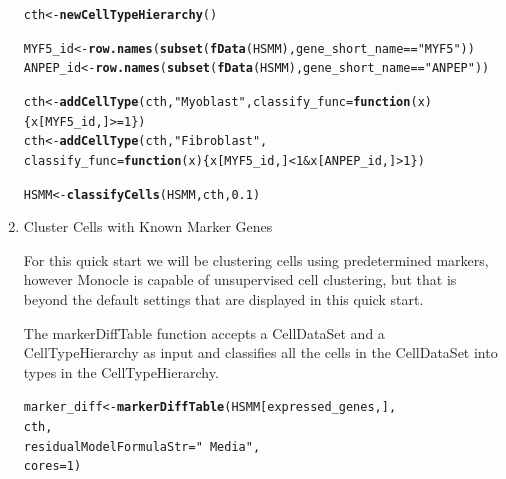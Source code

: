 \documentclass[10pt,oneside]{article}\usepackage[]{graphicx}\usepackage[]{color}
\makeatletter
\newcommand{\hlnum}[1]{\textcolor[rgb]{0.686,0.059,0.569}{#1}}%
\newcommand{\hlstr}[1]{\textcolor[rgb]{0.192,0.494,0.8}{#1}}%
\newcommand{\hlopt}[1]{\textcolor[rgb]{0,0,0}{#1}}%
\newcommand{\hlstd}[1]{\textcolor[rgb]{0.345,0.345,0.345}{#1}}%
\newcommand{\hlkwa}[1]{\textcolor[rgb]{0.161,0.373,0.58}{\textbf{#1}}}%
\newcommand{\hlkwb}[1]{\textcolor[rgb]{0.69,0.353,0.396}{#1}}%
\newcommand{\hlkwc}[1]{\textcolor[rgb]{0.333,0.667,0.333}{#1}}%
\newcommand{\hlkwd}[1]{\textcolor[rgb]{0.737,0.353,0.396}{\textbf{#1}}}%
\newenvironment{kframe}{%
 \def\at@end@of@kframe{}%
 \ifinner\ifhmode%
  \def\at@end@of@kframe{\end{minipage}}%
  \begin{minipage}{\columnwidth}%
 \fi\fi%
 \def\FrameCommand##1{\hskip\@totalleftmargin \hskip-\fboxsep
 \colorbox{shadecolor}{##1}\hskip-\fboxsep
     \hskip-\linewidth \hskip-\@totalleftmargin \hskip\columnwidth}%
 \MakeFramed {\advance\hsize-\width
   \@totalleftmargin\z@ \linewidth\hsize
   \@setminipage}}%
 {\par\unskip\endMakeFramed%
 \at@end@of@kframe}
\newenvironment{knitrout}{}{} %
\makeatother
\begin{document}
\begin{enumerate}
\begin{knitrout}
\color{fgcolor}\begin{kframe}
\begin{alltt}
\hlstd{cth} \hlkwb{<-} \hlkwd{newCellTypeHierarchy}\hlstd{()}

\hlstd{MYF5_id} \hlkwb{<-} \hlkwd{row.names}\hlstd{(}\hlkwd{subset}\hlstd{(}\hlkwd{fData}\hlstd{(HSMM), gene_short_name} \hlopt{==} \hlstr{"MYF5"}\hlstd{))}
\hlstd{ANPEP_id} \hlkwb{<-} \hlkwd{row.names}\hlstd{(}\hlkwd{subset}\hlstd{(}\hlkwd{fData}\hlstd{(HSMM), gene_short_name} \hlopt{==} \hlstr{"ANPEP"}\hlstd{))}

\hlstd{cth} \hlkwb{<-} \hlkwd{addCellType}\hlstd{(cth,} \hlstr{"Myoblast"}\hlstd{,} \hlkwc{classify_func} \hlstd{=} \hlkwa{function}\hlstd{(}\hlkwc{x}\hlstd{) \{x[MYF5_id,]} \hlopt{>=} \hlnum{1}\hlstd{\})}
\hlstd{cth} \hlkwb{<-} \hlkwd{addCellType}\hlstd{(cth,} \hlstr{"Fibroblast"}\hlstd{,}
                   \hlkwc{classify_func} \hlstd{=} \hlkwa{function}\hlstd{(}\hlkwc{x}\hlstd{) \{x[MYF5_id,]} \hlopt{<} \hlnum{1} \hlopt{&} \hlstd{x[ANPEP_id,]} \hlopt{>} \hlnum{1}\hlstd{\} )}

\hlstd{HSMM} \hlkwb{<-} \hlkwd{classifyCells}\hlstd{(HSMM, cth,} \hlnum{0.1}\hlstd{)}
\end{alltt}
\end{kframe}
\end{knitrout}
 
 \item Cluster Cells with Known Marker Genes
 
 For this quick start we will be clustering cells using predetermined markers, however Monocle is capable of unsupervised cell clustering, but that is beyond the default settings that are displayed in this quick start.
 
 The markerDiffTable function accepts a CellDataSet and a CellTypeHierarchy as input and classifies all the cells in the CellDataSet into types in the CellTypeHierarchy.
\begin{knitrout}
\color{fgcolor}\begin{kframe}
\begin{alltt}
\hlstd{marker_diff} \hlkwb{<-} \hlkwd{markerDiffTable}\hlstd{(HSMM[expressed_genes,],}
                               \hlstd{cth,}
                               \hlkwc{residualModelFormulaStr} \hlstd{=} \hlstr{"~Media"}\hlstd{,}
                               \hlkwc{cores} \hlstd{=} \hlnum{1}\hlstd{)}
\end{alltt}
\end{kframe}
\end{knitrout}
 

\end{enumerate}
\end{document}
